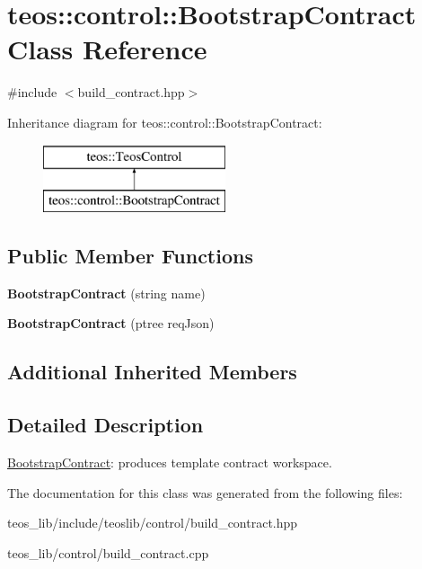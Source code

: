\hypertarget{classteos_1_1control_1_1_bootstrap_contract}{}\section{teos\+:\+:control\+:\+:Bootstrap\+Contract Class Reference}
\label{classteos_1_1control_1_1_bootstrap_contract}


{\ttfamily \#include $<$build\+\_\+contract.\+hpp$>$}

Inheritance diagram for teos\+:\+:control\+:\+:Bootstrap\+Contract\+:\begin{figure}[H]
\begin{center}
\leavevmode
\includegraphics[height=2.000000cm]{classteos_1_1control_1_1_bootstrap_contract}
\end{center}
\end{figure}
\subsection*{Public Member Functions}
\begin{DoxyCompactItemize}
\item 
\mbox{\label{classteos_1_1control_1_1_bootstrap_contract_a43979b7c9daa4406a374c18431e28407}} 
{\bfseries Bootstrap\+Contract} (string name)
\item 
\mbox{\label{classteos_1_1control_1_1_bootstrap_contract_ab7cbf4e4afab0d22739fbff222c1bd9e}} 
{\bfseries Bootstrap\+Contract} (ptree req\+Json)
\end{DoxyCompactItemize}
\subsection*{Additional Inherited Members}


\subsection{Detailed Description}
\mbox{\hyperlink{classteos_1_1control_1_1_bootstrap_contract}{Bootstrap\+Contract}}\+: produces template contract workspace. 

The documentation for this class was generated from the following files\+:\begin{DoxyCompactItemize}
\item 
teos\+\_\+lib/include/teoslib/control/build\+\_\+contract.\+hpp\item 
teos\+\_\+lib/control/build\+\_\+contract.\+cpp\end{DoxyCompactItemize}
